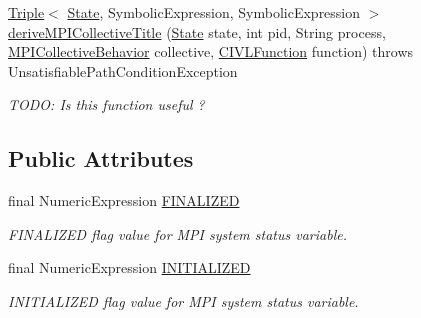 \begin{DoxyCompactItemize}
\item 
\hyperlink{classedu_1_1udel_1_1cis_1_1vsl_1_1civl_1_1util_1_1IF_1_1Triple}{Triple}$<$ \hyperlink{interfaceedu_1_1udel_1_1cis_1_1vsl_1_1civl_1_1state_1_1IF_1_1State}{State}, Symbolic\+Expression, Symbolic\+Expression $>$ \hyperlink{classedu_1_1udel_1_1cis_1_1vsl_1_1civl_1_1semantics_1_1contract_1_1ContractEvaluator_a086f6d930c9d3aa968b31b810f65b7ac}{derive\+M\+P\+I\+Collective\+Title} (\hyperlink{interfaceedu_1_1udel_1_1cis_1_1vsl_1_1civl_1_1state_1_1IF_1_1State}{State} state, int pid, String process, \hyperlink{interfaceedu_1_1udel_1_1cis_1_1vsl_1_1civl_1_1model_1_1IF_1_1contract_1_1MPICollectiveBehavior}{M\+P\+I\+Collective\+Behavior} collective, \hyperlink{interfaceedu_1_1udel_1_1cis_1_1vsl_1_1civl_1_1model_1_1IF_1_1CIVLFunction}{C\+I\+V\+L\+Function} function)  throws Unsatisfiable\+Path\+Condition\+Exception 
\begin{DoxyCompactList}\small\item\em T\+O\+D\+O\+: Is this function useful ? \end{DoxyCompactList}\end{DoxyCompactItemize}
\subsection*{Public Attributes}
\begin{DoxyCompactItemize}
\item 
\hypertarget{classedu_1_1udel_1_1cis_1_1vsl_1_1civl_1_1semantics_1_1contract_1_1ContractEvaluator_aa92746506992ef62eb79e214aa448269}{}final Numeric\+Expression \hyperlink{classedu_1_1udel_1_1cis_1_1vsl_1_1civl_1_1semantics_1_1contract_1_1ContractEvaluator_aa92746506992ef62eb79e214aa448269}{F\+I\+N\+A\+L\+I\+Z\+E\+D}\label{classedu_1_1udel_1_1cis_1_1vsl_1_1civl_1_1semantics_1_1contract_1_1ContractEvaluator_aa92746506992ef62eb79e214aa448269}

\begin{DoxyCompactList}\small\item\em F\+I\+N\+A\+L\+I\+Z\+E\+D flag value for M\+P\+I system status variable. \end{DoxyCompactList}\item 
\hypertarget{classedu_1_1udel_1_1cis_1_1vsl_1_1civl_1_1semantics_1_1contract_1_1ContractEvaluator_a39e08de973e61217254afeed475edfea}{}final Numeric\+Expression \hyperlink{classedu_1_1udel_1_1cis_1_1vsl_1_1civl_1_1semantics_1_1contract_1_1ContractEvaluator_a39e08de973e61217254afeed475edfea}{I\+N\+I\+T\+I\+A\+L\+I\+Z\+E\+D}\label{classedu_1_1udel_1_1cis_1_1vsl_1_1civl_1_1semantics_1_1contract_1_1ContractEvaluator_a39e08de973e61217254afeed475edfea}

\begin{DoxyCompactList}\small\item\em I\+N\+I\+T\+I\+A\+L\+I\+Z\+E\+D flag value for M\+P\+I system status variable. \end{DoxyCompactList}\end{DoxyCompactItemize}
